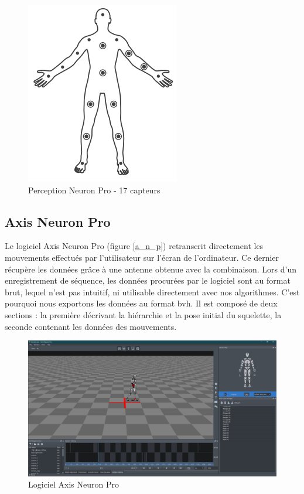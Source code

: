 \documentclass{article}
\begin{document}
\begin{figure}
	\centering
	\includegraphics[scale=0.5]{img/17sensors.png}
	\caption{Perception Neuron Pro - 17 capteurs}
	\label{pnp}
\end{figure}

\subsection{Axis Neuron Pro}

Le logiciel Axis Neuron Pro (figure \ref{a_n_p}) retranscrit directement les mouvements effectués par l'utilisateur sur l'écran de l'ordinateur. Ce dernier récupère les données grâce à une antenne obtenue avec la combinaison. Lors d'un enregistrement de séquence, les données procurées par le logiciel sont au format brut, lequel n'est pas intuitif, ni utilisable directement avec nos algorithmes. C'est pourquoi nous exportons les données au format \acrshort{bvh}. Il est composé de deux sections : la première décrivant la hiérarchie et la pose initial du squelette, la seconde contenant les données des mouvements.

\begin{figure}
	\centering
	\includegraphics[scale=0.17]{img/axis_neuron_pro.png}
	\caption{Logiciel Axis Neuron Pro}
	\label{z_anp}
\end{figure}
\end{document}
